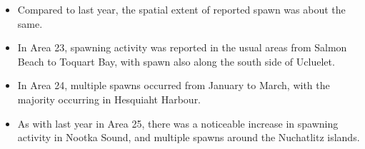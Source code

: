 \begin{itemize}
\item Compared to last year, the spatial extent of reported spawn was about the same.
\item In Area 23, spawning activity was reported in the usual areas from Salmon Beach to Toquart Bay, with spawn also along the south side of Ucluelet.
\item In Area 24, multiple spawns occurred from January to March, with the majority occurring in Hesquiaht Harbour.
\item As with last year in Area 25, there was a noticeable increase in spawning activity in Nootka Sound, and multiple spawns around the Nuchatlitz islands.
\end{itemize}